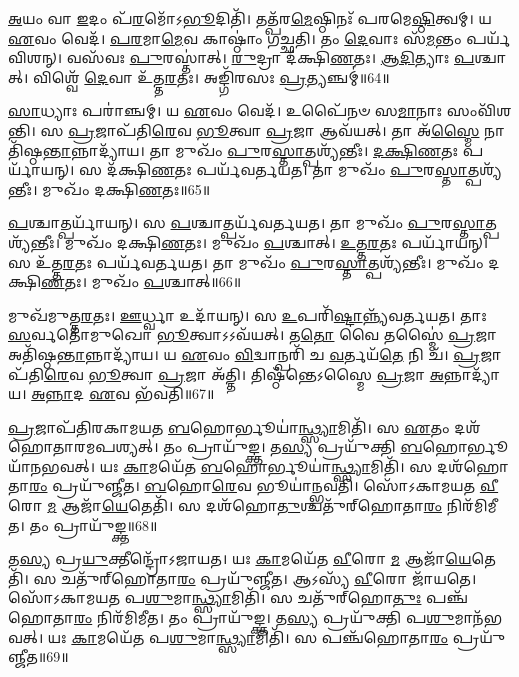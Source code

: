 \-\ul{𑌅}\-𑌯𑌂 𑌵𑌾 \ul{𑌇}\-𑌦𑌂 𑌪᳴\-\ul{𑌰}\-𑌮𑍋᳴\-𑌽\-\ul{𑌭𑍂}\-𑌦𑌿𑌤𑌿᳴।
𑌤𑌤𑍍𑌪᳴𑌰\-\ul{𑌮𑍇}\-𑌷𑍍𑌠𑌿𑌨𑌃᳴ 𑌪𑌰𑌮𑍇\-\ul{𑌷𑍍𑌠𑌿}\-𑌤𑍍𑌵𑌮𑍍।
𑌯 \ul{𑌏}\-𑌵𑌂 𑌵𑍇𑌦᳴।
\-\ul{𑌪}\-\-\ul{𑌰}\-𑌮𑌾\-\ul{𑌮𑍇}\-𑌵 𑌕𑌾𑌷𑍍𑌠𑌾𑌂॑ 𑌗𑌚𑍍𑌛𑌤𑌿।
𑌤𑌂 \ul{𑌦𑍇}\-𑌵𑌾𑌃 𑌸᳴\-\ul{𑌮}\-𑌨𑍍𑌤𑌂 𑌪𑌰𑍍𑌯᳴𑌵𑌿𑌶𑌨𑍍।
𑌵𑌸᳴𑌵𑌃 \ul{𑌪𑍁}\-𑌰𑌸𑍍𑌤𑌾॑𑌤𑍍।
\-\ul{𑌰𑍁}\-𑌦𑍍𑌰𑌾 𑌦᳴𑌕𑍍𑌷𑌿\-\ul{𑌣}\-𑌤𑌃।
\-\ul{𑌆}\-\-\ul{𑌦𑌿}\-𑌤𑍍𑌯𑌾𑌃 \ul{𑌪}\-𑌶𑍍𑌚𑌾𑌤𑍍।
𑌵𑌿𑌶𑍍𑌵𑍇᳴ \ul{𑌦𑍇}\-𑌵𑌾 𑌉᳴𑌤𑍍𑌤\-\ul{𑌰}\-𑌤𑌃।
𑌅𑌙𑍍𑌗𑌿᳴𑌰𑌸𑌃 \ul{𑌪𑍍𑌰}\-𑌤𑍍𑌯𑌞𑍍𑌚𑌮𑍍॑॥64॥

\-\ul{𑌸𑌾}\-𑌧𑍍𑌯𑌾𑌃 𑌪𑌰𑌾॑𑌞𑍍𑌚𑌮𑍍।
𑌯 \ul{𑌏}\-𑌵𑌂 𑌵𑍇𑌦᳴।
𑌉𑌪𑍈᳴𑌨𑍞 𑌸\-\ul{𑌮𑌾}\-𑌨𑌾𑌃 𑌸𑌂𑌵𑌿᳴𑌶𑌨𑍍𑌤𑌿।
𑌸 \ul{𑌪𑍍𑌰}\-𑌜𑌾𑌪᳴𑌤𑌿\-\ul{𑌰𑍇}\-𑌵 \ul{𑌭𑍂}\-𑌤𑍍𑌵𑌾 \ul{𑌪𑍍𑌰}\-𑌜𑌾 𑌆𑌵᳴𑌯𑌤𑍍।
𑌤𑌾 𑌅᳴\-\ul{𑌸𑍍𑌮𑍈} 𑌨𑌾𑌤𑌿᳴𑌷𑍍𑌠\-\ul{𑌨𑍍𑌤𑌾}\-𑌨𑍍𑌨𑌾𑌦𑍍𑌯𑌾᳴𑌯।
𑌤𑌾 𑌮𑍁𑌖𑌂᳴ \ul{𑌪𑍁}\-𑌰\-\ul{𑌸𑍍𑌤𑌾}\-𑌤𑍍𑌪𑌶𑍍𑌯᳴𑌨𑍍𑌤𑍀𑌃।
\-\ul{𑌦}\-\-\ul{𑌕𑍍𑌷𑌿}\-\-\ul{𑌣}\-𑌤𑌃 𑌪𑌰𑍍𑌯𑌾᳴𑌯𑌨𑍍।
𑌸 𑌦᳴𑌕𑍍𑌷𑌿\-\ul{𑌣}\-𑌤𑌃 𑌪𑌰𑍍𑌯᳴𑌵𑌰𑍍𑌤𑌯𑌤।
𑌤𑌾 𑌮𑍁𑌖𑌂᳴ \ul{𑌪𑍁}\-𑌰\-\ul{𑌸𑍍𑌤𑌾}\-𑌤𑍍𑌪𑌶𑍍𑌯᳴𑌨𑍍𑌤𑍀𑌃।
𑌮𑍁𑌖𑌂᳴ 𑌦𑌕𑍍𑌷𑌿\-\ul{𑌣}\-𑌤𑌃॥65॥

\-\ul{𑌪}\-𑌶𑍍𑌚𑌾𑌤𑍍𑌪𑌰𑍍𑌯𑌾᳴𑌯𑌨𑍍।
𑌸 \ul{𑌪}\-𑌶𑍍𑌚𑌾𑌤𑍍𑌪𑌰𑍍𑌯᳴𑌵𑌰𑍍𑌤𑌯𑌤।
𑌤𑌾 𑌮𑍁𑌖𑌂᳴ \ul{𑌪𑍁}\-𑌰\-\ul{𑌸𑍍𑌤𑌾}\-\-𑌤𑍍𑌪𑌶𑍍𑌯᳴𑌨𑍍𑌤𑍀𑌃।
𑌮𑍁𑌖𑌂᳴ 𑌦𑌕𑍍𑌷𑌿\-\ul{𑌣}\-𑌤𑌃।
𑌮𑍁𑌖𑌂᳴ \ul{𑌪}\-𑌶𑍍𑌚𑌾𑌤𑍍।
\-\ul{𑌉}\-\-\ul{𑌤𑍍𑌤}\-\-\ul{𑌰}\-𑌤𑌃 𑌪𑌰𑍍𑌯𑌾᳴𑌯𑌨𑍍।
𑌸 𑌉᳴𑌤𑍍𑌤\-\ul{𑌰}\-𑌤𑌃 𑌪𑌰𑍍𑌯᳴𑌵𑌰𑍍𑌤𑌯𑌤।
𑌤𑌾 𑌮𑍁𑌖𑌂᳴ \ul{𑌪𑍁}\-𑌰\-\ul{𑌸𑍍𑌤𑌾}\-𑌤𑍍𑌪𑌶𑍍𑌯᳴𑌨𑍍𑌤𑍀𑌃।
𑌮𑍁𑌖𑌂᳴ 𑌦𑌕𑍍𑌷𑌿\-\ul{𑌣}\-𑌤𑌃।
𑌮𑍁𑌖𑌂᳴ \ul{𑌪}\-𑌶𑍍𑌚𑌾𑌤𑍍॥66॥

𑌮𑍁𑌖᳴𑌮𑍁𑌤𑍍𑌤\-\ul{𑌰}\-𑌤𑌃।
\-\ul{𑌊}\-𑌰𑍍𑌧𑍍𑌵𑌾 𑌉𑌦𑌾᳴𑌯𑌨𑍍।
𑌸 \ul{𑌉}\-𑌪𑌰𑌿᳴\-\ul{𑌷𑍍𑌟𑌾}\-𑌨𑍍𑌨𑍍𑌯᳴𑌵𑌰𑍍𑌤𑌯𑌤।
𑌤𑌾𑌃 \ul{𑌸}\-𑌰𑍍𑌵𑌤𑍋᳴𑌮𑍁𑌖𑍋 \ul{𑌭𑍂}\-𑌤𑍍𑌵𑌾\-𑌽𑌽𑌵᳴𑌯𑌤𑍍।
𑌤\-\ul{𑌤𑍋} 𑌵𑍈 𑌤𑌸𑍍𑌮𑍈॑ \ul{𑌪𑍍𑌰}\-𑌜𑌾 𑌅𑌤𑌿᳴𑌷𑍍𑌠\-\ul{𑌨𑍍𑌤𑌾}\-𑌨𑍍𑌨𑌾𑌦𑍍𑌯𑌾᳴𑌯।
𑌯 \ul{𑌏}\-𑌵𑌂 \ul{𑌵𑌿}\-𑌦𑍍𑌵𑌾𑌨𑍍𑌪𑌰𑌿᳴ 𑌚 \ul{𑌵}\-𑌰𑍍𑌤𑌯᳴\-\ul{𑌤𑍇} 𑌨𑌿 𑌚᳴।
\-\ul{𑌪𑍍𑌰}\-𑌜𑌾𑌪᳴𑌤𑌿\-\ul{𑌰𑍇}\-𑌵 \ul{𑌭𑍂}\-𑌤𑍍𑌵𑌾 \ul{𑌪𑍍𑌰}\-𑌜𑌾 𑌅᳴𑌤𑍍𑌤𑌿।
𑌤𑌿𑌷𑍍𑌠᳴𑌨𑍍𑌤𑍇\-𑌽𑌸𑍍𑌮𑍈 \ul{𑌪𑍍𑌰}\-𑌜𑌾 \ul{𑌅}\-𑌨𑍍𑌨𑌾𑌦𑍍𑌯𑌾᳴𑌯।
\-\ul{𑌅}\-\-\ul{𑌨𑍍𑌨𑌾}\-𑌦 \ul{𑌏}\-𑌵 𑌭᳴𑌵𑌤𑌿॥67॥\anuvakamend[\-\ul{𑌆}\-\-\ul{𑌸𑍀}\-𑌦𑍍𑌵𑍇𑌦᳴ 𑌚𑌨𑍍𑌦𑍍𑌰\-\ul{𑌮}\-𑌸𑍍𑌤𑍍𑌵𑌂 𑌯 \ul{𑌏}\-𑌵𑌂 𑌵𑍇𑌦𑍇॑𑌨𑍍𑌦𑍍𑌰𑌿\-\ul{𑌯𑌾}\-𑌵𑍍𑌯𑍇᳴𑌵 𑌭᳴𑌵𑌤𑌿 \ul{𑌪𑍍𑌰}\-𑌤𑍍𑌯\-\ul{𑌞𑍍𑌚𑌂} 𑌮𑍁𑌖𑌂᳴ 𑌦𑌕𑍍𑌷𑌿\-\ul{𑌣}\-𑌤𑍋 𑌮𑍁𑌖𑌂᳴ \ul{𑌪}\-𑌶𑍍𑌚𑌾𑌨𑍍𑌨𑌵᳴ 𑌚]

\-\ul{𑌪𑍍𑌰}\-𑌜𑌾𑌪᳴𑌤𑌿𑌰𑌕𑌾𑌮𑌯𑌤 \ul{𑌬}\-𑌹𑍋𑌰𑍍𑌭𑍂𑌯𑌾॑\-\ul{𑌨𑍍𑌥𑍍𑌸𑍍𑌯𑌾}\-𑌮𑌿𑌤𑌿᳴।
𑌸 \ul{𑌏}\-𑌤𑌂 𑌦𑌶᳴𑌹𑍋𑌤𑌾𑌰𑌮𑌪𑌶𑍍𑌯𑌤𑍍।
𑌤𑌂 𑌪𑍍𑌰𑌾𑌯𑍁᳴𑌙𑍍𑌕𑍍𑌤।
𑌤\-\ul{𑌸𑍍𑌯} 𑌪𑍍𑌰𑌯𑍁᳴𑌕𑍍𑌤𑌿 \ul{𑌬}\-𑌹𑍋𑌰𑍍𑌭𑍂𑌯𑌾᳴𑌨𑌭𑌵𑌤𑍍।
𑌯𑌃 \ul{𑌕𑌾}\-𑌮𑌯𑍇᳴𑌤 \ul{𑌬}\-𑌹𑍋𑌰𑍍𑌭𑍂𑌯𑌾॑\-\ul{𑌨𑍍𑌥𑍍𑌸𑍍𑌯𑌾}\-𑌮𑌿𑌤𑌿᳴।
𑌸 𑌦𑌶᳴𑌹𑍋𑌤𑌾\-\ul{𑌰𑌂} 𑌪𑍍𑌰𑌯𑍁᳴𑌞𑍍𑌜𑍀𑌤।
\-\ul{𑌬}\-𑌹𑍋\-\ul{𑌰𑍇}\-𑌵 𑌭𑍂𑌯𑌾॑𑌨𑍍𑌭𑌵𑌤𑌿।
𑌸𑍋᳴𑌽𑌕𑌾𑌮𑌯𑌤 \ul{𑌵𑍀}\-𑌰𑍋 \ul{𑌮} 𑌆𑌜𑌾᳴\-\ul{𑌯𑍇}\-𑌤𑍇𑌤𑌿᳴।
𑌸 𑌦𑌶᳴𑌹𑍋\-\ul{𑌤𑍁}\-𑌶𑍍𑌚𑌤𑍁᳴𑌰𑍍‌\mbox{}𑌹𑍋𑌤𑌾\-\ul{𑌰𑌂} 𑌨𑌿𑌰᳴𑌮𑌿𑌮𑍀𑌤।
𑌤𑌂 𑌪𑍍𑌰𑌾𑌯𑍁᳴𑌙𑍍𑌕𑍍𑌤॥68॥

𑌤\-\ul{𑌸𑍍𑌯} 𑌪𑍍𑌰\-\ul{𑌯𑍁}\-𑌕𑍍𑌤𑍀𑌨𑍍𑌦𑍍𑌰𑍋᳴\-𑌽𑌜𑌾𑌯𑌤।
𑌯𑌃 \ul{𑌕𑌾}\-𑌮𑌯𑍇᳴𑌤 \ul{𑌵𑍀}\-𑌰𑍋 \ul{𑌮} 𑌆𑌜𑌾᳴\-\ul{𑌯𑍇}\-𑌤𑍇𑌤𑌿᳴।
𑌸 𑌚𑌤𑍁᳴𑌰𑍍‌\mbox{}𑌹𑍋𑌤𑌾\-\ul{𑌰𑌂} 𑌪𑍍𑌰𑌯𑍁᳴𑌞𑍍𑌜𑍀𑌤।
𑌆𑌽𑌸𑍍𑌯᳴ \ul{𑌵𑍀}\-𑌰𑍋 𑌜𑌾᳴𑌯𑌤𑍇।
𑌸𑍋᳴𑌽𑌕𑌾𑌮𑌯𑌤 𑌪\-\ul{𑌶𑍁}\-𑌮𑌾\-\ul{𑌨𑍍𑌥𑍍𑌸𑍍𑌯𑌾}\-𑌮𑌿𑌤𑌿᳴।
𑌸 𑌚𑌤𑍁᳴𑌰𑍍‌\mbox{}𑌹𑍋\-\ul{𑌤𑍁𑌃} 𑌪𑌞𑍍𑌚᳴𑌹𑍋𑌤𑌾\-\ul{𑌰𑌂} 𑌨𑌿𑌰᳴𑌮𑌿𑌮𑍀𑌤।
𑌤𑌂 𑌪𑍍𑌰𑌾𑌯𑍁᳴𑌙𑍍𑌕𑍍𑌤।
𑌤\-\ul{𑌸𑍍𑌯} 𑌪𑍍𑌰𑌯𑍁᳴𑌕𑍍𑌤𑌿 𑌪\-\ul{𑌶𑍁}\-𑌮𑌾𑌨᳴𑌭𑌵𑌤𑍍।
𑌯𑌃 \ul{𑌕𑌾}\-𑌮𑌯𑍇᳴𑌤 𑌪\-\ul{𑌶𑍁}\-𑌮𑌾\-\ul{𑌨𑍍𑌥𑍍𑌸𑍍𑌯𑌾}\-𑌮𑌿𑌤𑌿᳴।
𑌸 𑌪𑌞𑍍𑌚᳴𑌹𑍋𑌤𑌾\-\ul{𑌰𑌂} 𑌪𑍍𑌰𑌯𑍁᳴𑌞𑍍𑌜𑍀𑌤॥69॥

